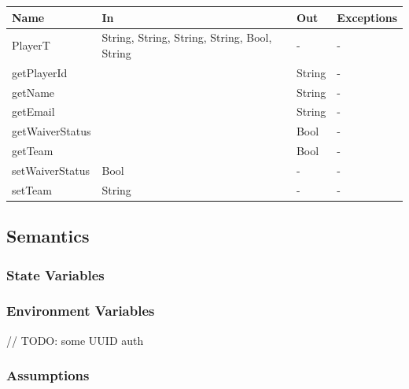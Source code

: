 \documentclass[12pt, titlepage]{article}
\begin{document}
\begin{center}
  \begin{tabular}{|p{4cm}| p{4cm}| p{4cm} | p{3cm}|}
    \hline
    \textbf{Name}   & \textbf{In}                                  & \textbf{Out} & \textbf{Exceptions} \\
    \hline
    PlayerT         & String, String, String, String, Bool, String & -            & -                   \\
    getPlayerId     &                                              & String       & -                   \\
    getName         &                                              & String       & -                   \\
    getEmail        &                                              & String       & -                   \\
    getWaiverStatus &                                              & Bool         & -                   \\
    getTeam         &                                              & Bool         & -                   \\
    setWaiverStatus & Bool                                         & -            & -                   \\
    setTeam         & String                                       & -            & -                   \\
    \hline
  \end{tabular}
\end{center}

\subsection{Semantics}

\subsubsection{State Variables}

\subsubsection{Environment Variables}

// TODO: some UUID auth

\subsubsection{Assumptions}
\end{document}
